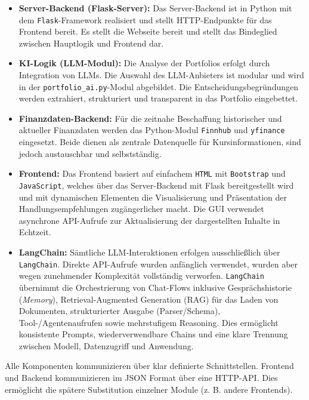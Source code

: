       \begin{itemize}
          \item \textbf{Server-Backend (Flask-Server):} Das Server-Backend ist in Python mit dem \texttt{Flask}-Framework realisiert und stellt HTTP-Endpunkte für das Frontend bereit.
          Es stellt die Webseite bereit und stellt das Bindeglied zwischen Hauptlogik und Frontend dar.

          \item \textbf{\acs{KI}-Logik (\acs{LLM}-Modul):} Die Analyse der Portfolios erfolgt durch Integration von \acs{LLM}s.
          Die Auswahl des \acs{LLM}-Anbieters ist modular und wird in der \texttt{portfolio\_ai.py}-Modul abgebildet.
          Die Entscheidungsbegründungen werden extrahiert, strukturiert und transparent in das Portfolio eingebettet.

          \item \textbf{Finanzdaten-Backend:} Für die zeitnahe Beschaffung historischer und aktueller Finanzdaten werden das Python-Modul \texttt{Finnhub} und \texttt{yfinance} eingesetzt.
          Beide dienen als zentrale Datenquelle für Kursinformationen, sind jedoch austauschbar und selbstständig.

          \item \textbf{Frontend:} Das Frontend basiert auf einfachem \texttt{HTML} mit \texttt{Bootstrap} und \texttt{JavaScript}, welches über das Server-Backend mit Flask bereitgestellt wird und mit dynamischen Elementen die Visualisierung und Präsentation der Handlungsempfehlungen zugängerlicher macht.
          Die \acs{GUI} verwendet asynchrone API-Aufrufe zur Aktualisierung der dargestellten Inhalte in Echtzeit.

          \item \textbf{LangChain:} Sämtliche \acs{LLM}-Interaktionen erfolgen ausschließlich über \texttt{LangChain}.
          Direkte API-Aufrufe wurden anfänglich verwendet, wurden aber wegen zunehmender Komplexität vollständig verworfen.
          \texttt{LangChain} übernimmt die Orchestrierung von Chat-Flows inklusive Gesprächshistorie (\emph{Memory}), Retrieval-Augmented Generation (\acs{RAG}) für das Laden von Dokumenten, strukturierter Ausgabe (Parser/Schema), Tool-/Agentenaufrufen sowie mehrstufigem Reasoning.
          Dies ermöglicht konsistente Prompts, wiederverwendbare Chains und eine klare Trennung zwischen Modell, Datenzugriff und Anwendung.
      \end{itemize}

      Alle Komponenten kommunizieren über klar definierte Schnittstellen.
      Frontend und Backend kommunizieren im \acs{JSON} Format über eine \acs{HTTP}-API.
      Dies ermöglicht die spätere Substitution einzelner Module (z. B. andere Frontends).

